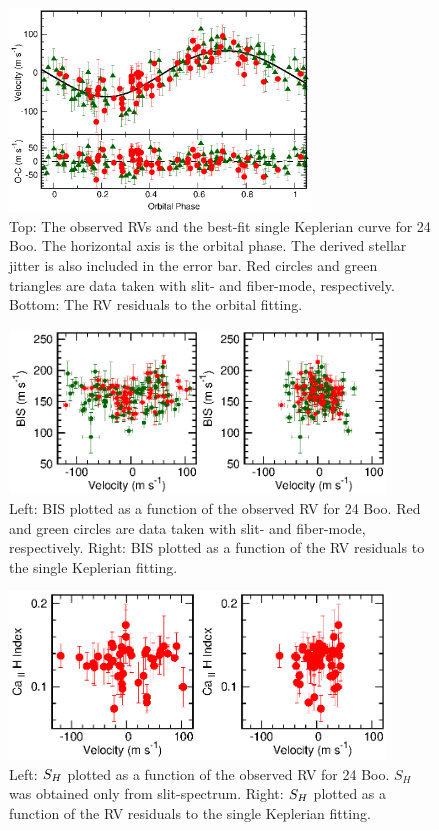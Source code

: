 \documentclass[]{pasj01}
\begin{document}
\begin{figure}
\begin{center}
\includegraphics[width=8cm]{re_rv_resi_127243.eps}
\end{center}
\caption{Top: The observed RVs and the best-fit single Keplerian curve for 24 Boo. The horizontal axis is the orbital phase. The derived stellar jitter is also included in the error bar. Red circles and green triangles are data taken with slit- and fiber-mode, respectively. Bottom: The RV residuals to the orbital fitting.}
\label{re_rv_resi_127243}
\end{figure}

\begin{figure}
\begin{center}
\includegraphics[width=10cm]{re_rv_resi_bis_127243.eps}
\end{center}
\caption{Left: BIS plotted as a function of the observed RV for 24 Boo. Red and green circles are data taken with slit- and fiber-mode, respectively. Right: BIS plotted as a function of the RV residuals to the single Keplerian fitting.}
\label{re_rv_resi_bis_127243}
\end{figure}

\begin{figure}
\begin{center}
\includegraphics[width=10cm]{re_rv_resi_cahk_127243.eps}
\end{center}
\caption{Left: $S_{\rm H}$ plotted as a function of the observed RV for 24 Boo. $S_{H}$ was obtained only from slit-spectrum. Right: $S_{\rm H}$ plotted as a function of the RV residuals to the single Keplerian fitting.}
\label{re_rv_bis_cahk_127243}
\end{figure}
\end{document}
